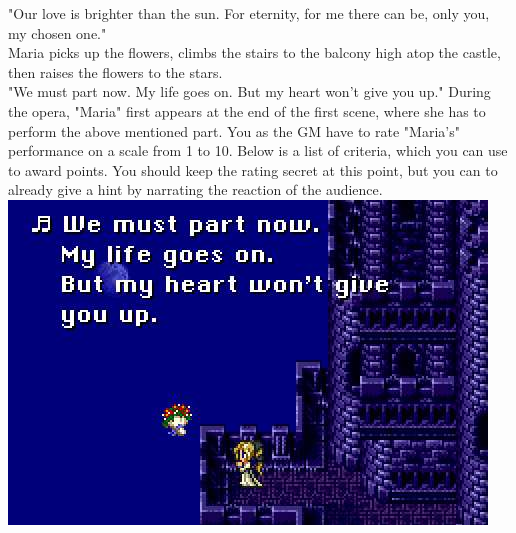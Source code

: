 "Our love is brighter than the sun. For eternity, for me there can be, only you, my chosen one."\vspace{0.2cm}\\ 
Maria picks up the flowers, climbs the stairs to the balcony high atop the castle, then raises the flowers to the stars.\vspace{0.2cm}\\
"We must part now. My life goes on. But my heart won't give you up."
%
%
\vfill
%
During the opera, "Maria" first appears at the end of the first scene, where she has to perform the above mentioned part.
You as the GM have to rate "Maria's" performance on a scale from 1 to 10.
Below is a list of criteria, which you can use to award points.
You should keep the rating secret at this point, but you can to already give a hint by narrating the reaction of the audience.
%
\clearpage
%
\includegraphics[width=\columnwidth]{./art/mariaanddraco/maria.jpg}\\
%
\vfill
%
%
\vfill
%
